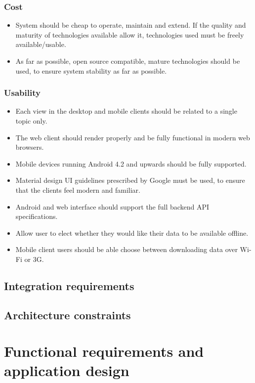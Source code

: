 \documentclass[a4paper,10pt]{article}
\begin{document}
\subsubsection{Cost}
\begin{itemize}
\item System should be cheap to operate, maintain and extend. If the quality and maturity of technologies available allow it, technologies used must be freely available/usable.
\item As far as possible, open source compatible, mature technologies should be used, to ensure system stability as far as possible.
\end{itemize}

\subsubsection{Usability}
\begin{itemize}
\item Each view in the desktop and mobile clients should be related to a single topic only.
\item The web client should render properly and be fully functional in modern web browsers.
\item Mobile devices running Android 4.2 and upwards should be fully supported.
\item Material design UI guidelines prescribed by Google must be used, to ensure that the clients feel modern and familiar. 
\item Android and web interface should support the full backend API specifications.
\item Allow user to elect whether they would like their data to be available offline.
\item Mobile client users should be able choose between downloading data over Wi-Fi or 3G. 
\end{itemize}

\subsection{Integration requirements}

\subsection{Architecture constraints}

\section{Functional requirements and application design}
\end{document}
